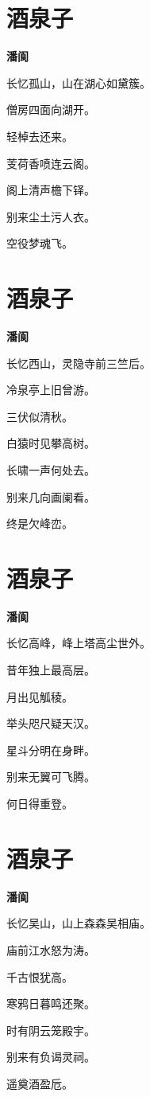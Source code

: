\documentclass[12pt,a4paper]{ctexbook}
\begin{document}
\section{酒泉子}
\textbf{潘阆}\par\vspace{0.5em}
长忆孤山，山在湖心如黛簇。\par
僧房四面向湖开。\par
轻棹去还来。\par
芰荷香喷连云阁。\par
阁上清声檐下铎。\par
别来尘土污人衣。\par
空役梦魂飞。\par

\section{酒泉子}
\textbf{潘阆}\par\vspace{0.5em}
长忆西山，灵隐寺前三竺后。\par
冷泉亭上旧曾游。\par
三伏似清秋。\par
白猿时见攀高树。\par
长啸一声何处去。\par
别来几向画阑看。\par
终是欠峰峦。\par

\section{酒泉子}
\textbf{潘阆}\par\vspace{0.5em}
长忆高峰，峰上塔高尘世外。\par
昔年独上最高层。\par
月出见觚稜。\par
举头咫尺疑天汉。\par
星斗分明在身畔。\par
别来无翼可飞腾。\par
何日得重登。\par

\section{酒泉子}
\textbf{潘阆}\par\vspace{0.5em}
长忆吴山，山上森森吴相庙。\par
庙前江水怒为涛。\par
千古恨犹高。\par
寒鸦日暮鸣还聚。\par
时有阴云笼殿宇。\par
别来有负谒灵祠。\par
遥奠酒盈卮。\par
\end{document}
